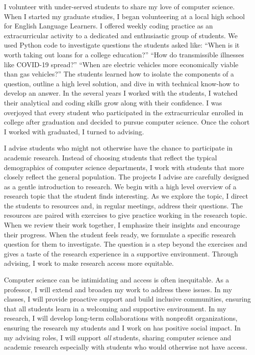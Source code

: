 \documentclass[11pt]{article}
\begin{document}

I volunteer with under-served students to share my love of computer science. 
When I started my graduate studies, I began volunteering at a local high school for English Language Learners.
I offered weekly coding practice as an extracurricular activity to a dedicated and enthusiastic group of students.
We used Python code to investigate questions the students asked like: 
``When is it worth taking out loans for a college education?''
``How do transmissible illnesses like COVID-19 spread?''
``When are electric vehicles more economically viable than gas vehicles?''
The students learned how to isolate the components of a question, outline a high level solution, and dive in with technical know-how to develop an answer.
In the several years I worked with the students, I watched their analytical and coding skills grow along with their confidence.
I was overjoyed that every student who participated in the extracurricular enrolled in college after graduation and decided to pursue computer science.
Once the cohort I worked with graduated, I turned to advising.


I advise students who might not otherwise have the chance to participate in academic research.
Instead of choosing students that reflect the typical demographics of computer science departments, I work with students that more closely reflect the general population.
The projects I advise are carefully designed as a gentle introduction to research.
We begin with a high level overview of a research topic that the student finds interesting.
As we explore the topic, I direct the students to resources and, in regular meetings, address their questions.
The resources are paired with exercises to give practice working in the research topic.
When we review their work together, I emphasize their insights and encourage their progress.
When the student feels ready, we formulate a specific research question for them to investigate.
The question is a step beyond the exercises and gives a taste of the research experience in a supportive environment.
Through advising, I work to make research access more equitable.


Computer science can be intimidating and access is often inequitable.
As a professor, I will extend and broaden my work to address these issues.
In my classes, I will provide proactive support and build inclusive communities, ensuring that all students learn in a welcoming and supportive environment.
In my research, I will develop long-term collaborations with nonprofit organizations, ensuring the research my students and I work on has positive social impact.
In my advising roles, I will support \textit{all} students, sharing computer science and academic research especially with students who would otherwise not have access.



\end{document}
